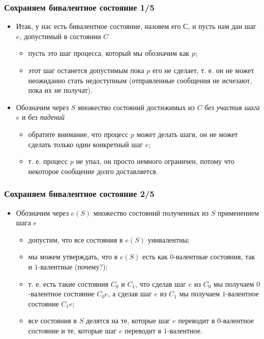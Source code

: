 \begin{frame}
\frametitle{Сохраняем бивалентное состояние 1/5}
\begin{itemize}
  \item Итак, у нас есть бивалентное состояние, назовем его $С$, и пусть нам дан
  шаг $e$, допустимый в состоянии $C$
  \begin{itemize}
    \item пусть это шаг процесса, который мы обозначим как $p$;
    \item этот шаг останется допустимым пока $p$ его не сделает, т. е. он не
    может неожиданно стать недоступным (отправленные сообщения не исчезают,
    пока их не получат).
  \end{itemize}
  \item Обозначим через $S$ множество состояний достижимых из $C$ \emph{без
  участия шага} $e$ и \emph{без падений}
  \begin{itemize}
    \item обратите внимание, что процесс $p$ может делать шаги, он не может
    сделать только один конкретный шаг $e$;
    \item т. е. процесс $p$ не упал, он просто немного ограничен, потому что
    некоторое сообщение долго доставляется.
  \end{itemize}
\end{itemize}
\end{frame}

\begin{frame}
\frametitle{Сохраняем бивалентное состояние 2/5}
\begin{itemize}
  \item Обозначим через $e\left(S\right)$ множество состояний полученных из $S$
  применением шага $e$
  \begin{itemize}
    \item допустим, что все состояния в $e\left(S\right)$ унивалентны;
    \item мы можем утверждать, что в $e\left(S\right)$ есть как $0$-валентные
    состояния, так и $1$-валентные (почему?);
    \item т. е. есть такие состояния $C_0$ и $C_1$, что сделав шаг $e$ из $C_0$
    мы получаем $0$-валентное состояние $C_0e$, а сделав шаг $e$ из $C_1$ мы
    получаем $1$-валентное состояние $C_1e$;
    \item все состояния в $S$ делятся на те, которые шаг $e$ переводит в
    $0$-валентное состояние и те, которые шаг $e$ переводит в $1$-валентное.
  \end{itemize}
\end{itemize}
\end{frame}

